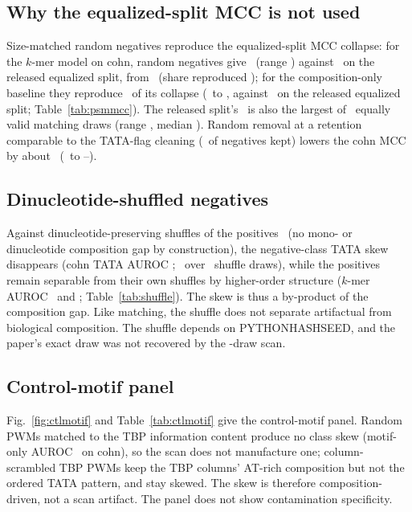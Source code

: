 \documentclass[journal,onecolumn,10pt,letterpaper]{IEEEtran}
\newcommand{\tasku}{\textunderscore\allowbreak}
\DeclareRobustCommand{\task}[1]{{\normalfont\ttfamily\upshape\let\_\tasku #1}}
\begin{document}
\subsection{Why the equalized-split MCC is not used}
Size-matched random negatives reproduce the equalized-split MCC collapse: for the $k$-mer model on
\task{cohn}, random negatives give \smMCCrand\ (range \smMCCrandRange) against \smMCCpub\ on the
released equalized split, from \smMCCzero\ (share reproduced \smMCCshare); for the composition-only
baseline they reproduce \smCompMCCshare\ of its collapse (\smCompMCCzero\ to \smCompMCCrand, against
\smCompMCCpub\ on the released equalized split; Table~\ref{tab:psmmcc}). The released split's \smMCCpub\
is also the largest of \smDraws\ equally valid matching draws (range \smDrawMCC, median \smDrawMCCmed).
Random removal at a retention comparable to the TATA-flag cleaning (\smMCCrandKeptRange\ of negatives
kept) lowers the \task{cohn} MCC by about \smMCCrandDrop\ (\smMCCzero\ to \smMCCrandMin--\smMCCrandMax).



\subsection{Dinucleotide-shuffled negatives}
Against dinucleotide-preserving shuffles of the positives~\cite{altschul1985} (no mono- or
dinucleotide composition gap by construction), the negative-class TATA skew disappears
(\task{cohn} TATA AUROC \smShufTata; \smShufTataRange\ over \smHashDraws\ shuffle draws), while the positives remain
separable from their own shuffles by higher-order structure ($k$-mer AUROC \smShufKmerCohn\ and
\smShufKmerNt; Table~\ref{tab:shuffle}). The skew is thus a by-product of the composition gap. Like
matching, the shuffle does not separate artifactual from biological composition. The shuffle depends
on \task{PYTHONHASHSEED}, and the paper's exact draw was not recovered by the \smHashDraws-draw scan.



\subsection{Control-motif panel}\label{sec:s4ctl}
Fig.~\ref{fig:ctlmotif} and Table~\ref{tab:ctlmotif} give the control-motif panel. Random PWMs matched to the TBP information content produce no class skew
(motif-only AUROC \smRandICcohn\ on \task{cohn}), so the scan does not manufacture one;
column-scrambled TBP PWMs keep the TBP columns' AT-rich composition but not the ordered TATA pattern,
and stay skewed. The skew is therefore composition-driven, not a scan artifact. The panel does not
show contamination specificity.
\end{document}
